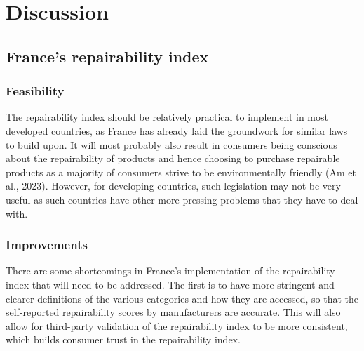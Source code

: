 \documentclass[11pt]{article}
\makeatletter
\newcommand{\citeprocitem}[2]{\hyper@linkstart{cite}{citeproc_bib_item_#1}#2\hyper@linkend}
\makeatother
\begin{document}
 \newpage

\section{Discussion}
\label{sec:org6da0dba}

\subsection{France's repairability index}
\label{sec:org6f6c722}

\subsubsection{Feasibility}
\label{sec:orgc454f89}
The repairability index should be relatively practical to implement in most developed countries, as France has already laid the groundwork for similar laws to build upon. It will most probably also result in consumers being conscious about the repairability of products and hence choosing to purchase repairable products as a majority of consumers strive to be environmentally friendly (\citeprocitem{1}{Am et al., 2023}). However, for developing countries, such legislation may not be very useful as such countries have other more pressing problems that they have to deal with.

\subsubsection{Improvements}
\label{sec:orgfc79074}
There are some shortcomings in France's implementation of the repairability index that will need to be addressed. The first is to have more stringent and clearer definitions of the various categories and how they are accessed, so that the self-reported repairability scores by manufacturers are accurate. This will also allow for third-party validation of the repairability index to be more consistent, which builds consumer trust in the repairability index.

 \newpage
\end{document}
